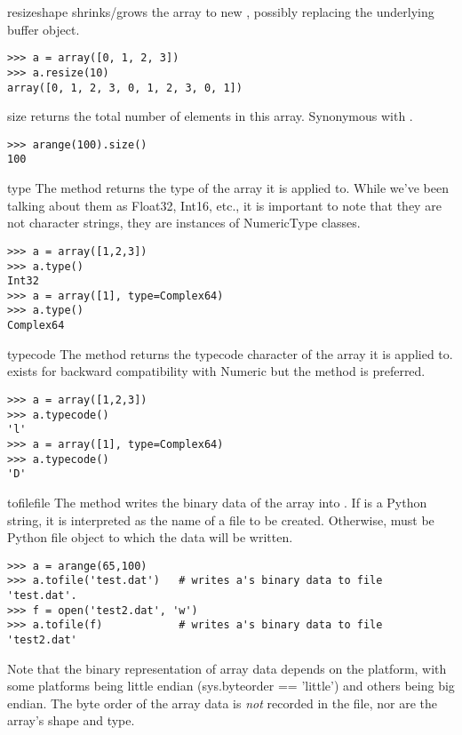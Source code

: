 \begin{methoddesc}[numarray]{resize}{shape}
  \label{arraymethod:resize}
    shrinks/grows the array to new , possibly
    replacing the underlying buffer object.
\begin{verbatim}
>>> a = array([0, 1, 2, 3])
>>> a.resize(10)
array([0, 1, 2, 3, 0, 1, 2, 3, 0, 1])
\end{verbatim}
\end{methoddesc}


\begin{methoddesc}[numarray]{size}{}
  \label{arraymethod:size}
   returns the total number of elements in this array.
  Synonymous with .
\begin{verbatim}
>>> arange(100).size()
100
\end{verbatim}
\end{methoddesc}


\begin{methoddesc}[numarray]{type}{}
  \label{arraymethod:type}
   The  method returns the type of the array it is applied to.
   While we've been talking about them as Float32, Int16, etc., it is important
   to note that they are not character strings, they are instances of
   NumericType classes. 
\begin{verbatim}
>>> a = array([1,2,3])
>>> a.type()
Int32
>>> a = array([1], type=Complex64)
>>> a.type()
Complex64
\end{verbatim}
\end{methoddesc}


\begin{methoddesc}[numarray]{typecode}{}
  \label{arraymethod:typecode}
   The  method returns the typecode character of the array it
   is applied to.   exists for backward compatibility with
   Numeric but the  method is preferred.
\begin{verbatim}
>>> a = array([1,2,3])
>>> a.typecode()
'l'
>>> a = array([1], type=Complex64)
>>> a.typecode()
'D'
\end{verbatim}
\end{methoddesc}


\begin{methoddesc}[numarray]{tofile}{file}
  \label{arraymethod:tofile}
  The  method writes the binary data of the array into
  .  If  is a Python string, it is interpreted 
  as the name of a file to be created.  Otherwise,  must be 
  Python file object to which the data will be written.  
\begin{verbatim}
>>> a = arange(65,100)
>>> a.tofile('test.dat')   # writes a's binary data to file 'test.dat'.
>>> f = open('test2.dat', 'w')
>>> a.tofile(f)            # writes a's binary data to file 'test2.dat'
\end{verbatim}
   Note that the binary representation of array data depends on the platform,
   with some platforms being little endian (sys.byteorder == 'little') and
   others being big endian.  The byte order of the array data is \emph{not}
   recorded in the file, nor are the array's shape and type.
\end{methoddesc}


